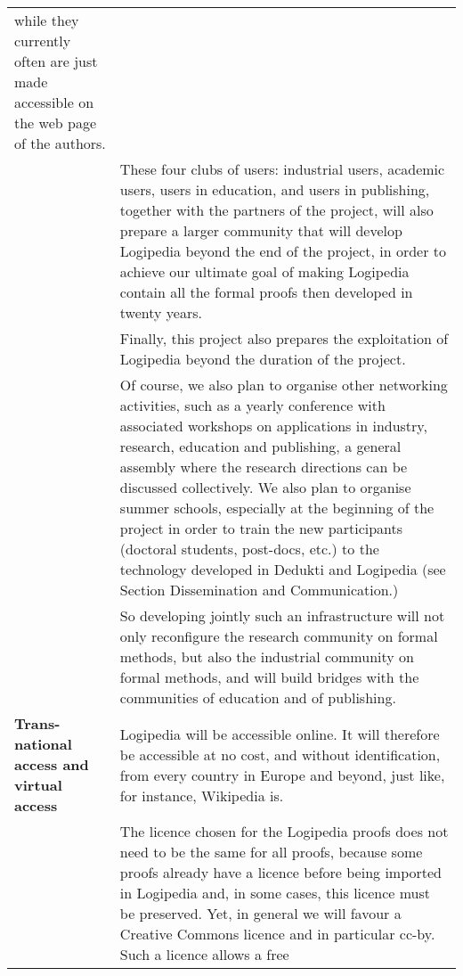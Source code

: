 \begin{longtable*}{|p{0.2\textwidth}|p{0.75\textwidth}|}
while they currently often are just made accessible
on the web page of the authors.\\
&
\hspace{0.4cm}
These four clubs of users: industrial users, academic users, users in 
education, and users in publishing, together with the partners of the 
project, will also
prepare a larger community that will develop Logipedia beyond the end
of the project, in order to achieve our ultimate goal of making
Logipedia contain all the formal proofs then developed in twenty
years.\\
&
\hspace{0.4cm}
Finally, this project also prepares the exploitation of Logipedia
beyond the duration of the project.\\
&
\hspace{0.4cm}
Of course, we also plan to organise other networking activities,
such as a yearly conference with associated workshops on applications
in industry, research, education and publishing, a general assembly
where the research directions can be discussed collectively. We also plan to organise
summer schools, especially at the beginning of the project in order to
train the new participants (doctoral students, post-docs, etc.) to the
technology developed in Dedukti and Logipedia
(see Section Dissemination and Communication.)\\
&
\hspace{0.4cm}
So developing jointly such an infrastructure will not only reconfigure
the research community on formal methods, but also the industrial
community on formal methods, and will build bridges with the communities
of education and of publishing.\\
\hline
{\bf Trans-national access and virtual access}
&
Logipedia will be accessible online. It will therefore be accessible
at no cost, and without identification, from every country in Europe
and beyond, just like, for instance, Wikipedia is.\\
&
\hspace{0.4cm} The licence chosen for the Logipedia proofs does not
need to be the same for all proofs, because some proofs already have a
licence before being imported in Logipedia and, in some cases, this
licence must be preserved.  Yet, in general we will favour a Creative
Commons licence and in particular cc-by.  Such a licence allows a free

\end{longtable*}
